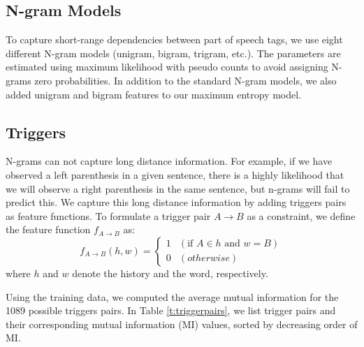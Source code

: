 \documentclass[11pt]{article}
\begin{document}
\subsection{N-gram Models}

To capture short-range dependencies between part of speech tags, we use
eight different N-gram models (unigram, bigram, trigram, etc.). The
parameters are estimated using maximum likelihood with pseudo counts to
avoid assigning N-grams zero probabilities. In addition to the standard
N-gram models, we also added unigram and bigram features to our maximum
entropy model. 

\subsection{Triggers}
\label{sec:trigger}
N-grams can not capture long distance information.
For example, if we have observed a left parenthesis in a given sentence,
there is a highly likelihood that we will observe a right parenthesis in the same sentence,
but n-grams will fail to predict this.
We capture this long distance information by adding triggers pairs as feature functions.
To formulate a trigger pair $A \rightarrow B$ as a constraint, we define the feature function $f_{A \rightarrow B}$ as:
\[
  f_{A \rightarrow B}(h, w) = \begin{cases}
    1 & (\textrm{if } A \in h \textrm{ and } w = B) \\
    0 & (otherwise)
  \end{cases}
\]
where $h$ and $w$ denote the history and the word, respectively.

Using the training data, we computed the average mutual information for the 1089 possible triggers pairs.
In Table \ref{t:triggerpairs}, we list trigger pairs and their corresponding mutual information (MI) values, sorted by decreasing order of MI.
\end{document}
